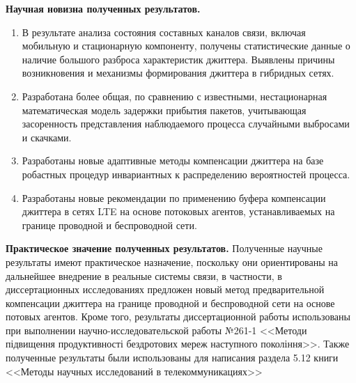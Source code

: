 \textbf{Научная новизна полученных результатов.} 
\begin{enumerate}
  \item В результате анализа состояния составных каналов связи, включая мобильную и стационарную компоненту, получены статистические данные о наличие большого разброса характеристик джиттера.
  Выявлены причины возникновения и механизмы формирования джиттера в гибридных сетях.
 

  \item Разработана более общая, по сравнению с известными, нестационарная математическая модель задержки прибытия пакетов,
  учитывающая засоренность представления наблюдаемого процесса случайными выбросами и скачками.
  \item 
  Разработаны новые адаптивные методы компенсации джиттера на базе робастных процедур инвариантных к распределению вероятностей процесса.
  \item 
  Разработаны новые рекомендации по применению буфера компенсации джиттера в сетях LTE на основе потоковых агентов, устанавливаемых на границе проводной и беспроводной сети.
\end{enumerate}

\textbf{Практическое значение полученных результатов.} Полученные научные результаты имеют практическое назначение, 
поскольку они ориентированы на дальнейшее внедрение в реальные системы связи, 
в частности, в диссертационных исследованиях предложен новый метод предварительной компенсации джиттера на границе проводной и беспроводной сети на основе потовых агентов.
Кроме того, результаты диссертационной работы использованы при выполнении научно-исследовательской работы №261-1 <<Методи підвищення продуктивності бездротових мереж наступного покоління>>.
Также полученные результаты были использованы для написания раздела 5.12 книги <<Методы научных исследований в телекоммуникациях>> \cite{popovski_method}


